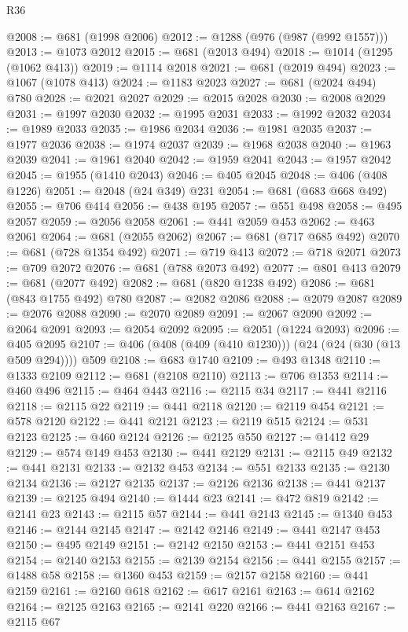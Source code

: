 \begin{lexlean}{R36}
\begin{coremodule}
@2008 := @681 (@1998 @2006)
@2012 := @1288 (@976 (@987 (@992 @1557)))
@2013 := @1073 @2012
@2015 := @681 (@2013 @494)
@2018 := @1014 (@1295 (@1062 @413))
@2019 := @1114 @2018
@2021 := @681 (@2019 @494)
@2023 := @1067 (@1078 @413)
@2024 := @1183 @2023
@2027 := @681 (@2024 @494) @780
@2028 := @2021 @2027
@2029 := @2015 @2028
@2030 := @2008 @2029
@2031 := @1997 @2030
@2032 := @1995 @2031
@2033 := @1992 @2032
@2034 := @1989 @2033
@2035 := @1986 @2034
@2036 := @1981 @2035
@2037 := @1977 @2036
@2038 := @1974 @2037
@2039 := @1968 @2038
@2040 := @1963 @2039
@2041 := @1961 @2040
@2042 := @1959 @2041
@2043 := @1957 @2042
@2045 := @1955 (@1410 @2043)
@2046 := @405 @2045
@2048 := @406 (@408 @1226)
@2051 := @2048 (@24 @349) @231
@2054 := @681 (@683 @668 @492)
@2055 := @706 @414
@2056 := @438 @195
@2057 := @551 @498
@2058 := @495 @2057
@2059 := @2056 @2058
@2061 := @441 @2059 @453
@2062 := @463 @2061
@2064 := @681 (@2055 @2062)
@2067 := @681 (@717 @685 @492)
@2070 := @681 (@728 @1354 @492)
@2071 := @719 @413
@2072 := @718 @2071
@2073 := @709 @2072
@2076 := @681 (@788 @2073 @492)
@2077 := @801 @413
@2079 := @681 (@2077 @492)
@2082 := @681 (@820 @1238 @492)
@2086 := @681 (@843 @1755 @492) @780
@2087 := @2082 @2086
@2088 := @2079 @2087
@2089 := @2076 @2088
@2090 := @2070 @2089
@2091 := @2067 @2090
@2092 := @2064 @2091
@2093 := @2054 @2092
@2095 := @2051 (@1224 @2093)
@2096 := @405 @2095
@2107 := @406 (@408 (@409 (@410 @1230))) (@24 (@24 (@30 (@13 @509 @294)))) @509
@2108 := @683 @1740
@2109 := @493 @1348
@2110 := @1333 @2109
@2112 := @681 (@2108 @2110)
@2113 := @706 @1353
@2114 := @460 @496
@2115 := @464 @443
@2116 := @2115 @34
@2117 := @441 @2116
@2118 := @2115 @22
@2119 := @441 @2118
@2120 := @2119 @454
@2121 := @578 @2120
@2122 := @441 @2121
@2123 := @2119 @515
@2124 := @531 @2123
@2125 := @460 @2124
@2126 := @2125 @550
@2127 := @1412 @29
@2129 := @574 @149 @453
@2130 := @441 @2129
@2131 := @2115 @49
@2132 := @441 @2131
@2133 := @2132 @453
@2134 := @551 @2133
@2135 := @2130 @2134
@2136 := @2127 @2135
@2137 := @2126 @2136
@2138 := @441 @2137
@2139 := @2125 @494
@2140 := @1444 @23
@2141 := @472 @819
@2142 := @2141 @23
@2143 := @2115 @57
@2144 := @441 @2143
@2145 := @1340 @453
@2146 := @2144 @2145
@2147 := @2142 @2146
@2149 := @441 @2147 @453
@2150 := @495 @2149
@2151 := @2142 @2150
@2153 := @441 @2151 @453
@2154 := @2140 @2153
@2155 := @2139 @2154
@2156 := @441 @2155
@2157 := @1488 @58
@2158 := @1360 @453
@2159 := @2157 @2158
@2160 := @441 @2159
@2161 := @2160 @618
@2162 := @617 @2161
@2163 := @614 @2162
@2164 := @2125 @2163
@2165 := @2141 @220
@2166 := @441 @2163
@2167 := @2115 @67

\end{coremodule}
\end{lexlean}

